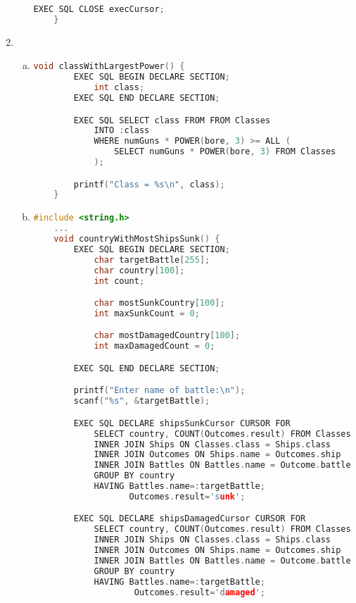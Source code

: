\documentclass[12pt]{article}
\begin{document}
\begin{enumerate}[1.]
\begin{enumerate}[a)]
\begin{lstlisting}[language=c]
        EXEC SQL CLOSE execCursor;
    }
    \end{lstlisting}

    \end{enumerate}

    \item

    \begin{enumerate}[a)]
        \item

    \begin{lstlisting}[language=c]
    void classWithLargestPower() {
        EXEC SQL BEGIN DECLARE SECTION;
            int class;
        EXEC SQL END DECLARE SECTION;

        EXEC SQL SELECT class FROM FROM Classes
            INTO :class
            WHERE numGuns * POWER(bore, 3) >= ALL (
                SELECT numGuns * POWER(bore, 3) FROM Classes
            );

        printf("Class = %s\n", class);
    }
    \end{lstlisting}

        \item

    \begin{lstlisting}[language=c]
    #include <string.h>
    ...
    void countryWithMostShipsSunk() {
        EXEC SQL BEGIN DECLARE SECTION;
            char targetBattle[255];
            char country[100];
            int count;

            char mostSunkCountry[100];
            int maxSunkCount = 0;

            char mostDamagedCountry[100];
            int maxDamagedCount = 0;

        EXEC SQL END DECLARE SECTION;

        printf("Enter name of battle:\n");
        scanf("%s", &targetBattle);

        EXEC SQL DECLARE shipsSunkCursor CURSOR FOR
            SELECT country, COUNT(Outcomes.result) FROM Classes
            INNER JOIN Ships ON Classes.class = Ships.class
            INNER JOIN Outcomes ON Ships.name = Outcomes.ship
            INNER JOIN Battles ON Battles.name = Outcome.battle
            GROUP BY country
            HAVING Battles.name=:targetBattle;
                   Outcomes.result='sunk';

        EXEC SQL DECLARE shipsDamagedCursor CURSOR FOR
            SELECT country, COUNT(Outcomes.result) FROM Classes
            INNER JOIN Ships ON Classes.class = Ships.class
            INNER JOIN Outcomes ON Ships.name = Outcomes.ship
            INNER JOIN Battles ON Battles.name = Outcome.battle
            GROUP BY country
            HAVING Battles.name=:targetBattle;
                    Outcomes.result='damaged';


\end{lstlisting}
\end{enumerate}
\end{enumerate}
\end{document}
